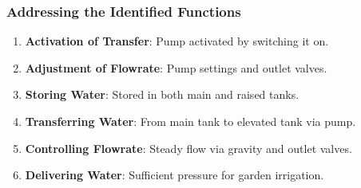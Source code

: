 \documentclass{article}
\begin{document}
\subsubsection*{Addressing the Identified Functions}
\begin{enumerate}
    \item \textbf{Activation of Transfer}: Pump activated by switching it on.
    \item \textbf{Adjustment of Flowrate}: Pump settings and outlet valves.
    \item \textbf{Storing Water}: Stored in both main and raised tanks.
    \item \textbf{Transferring Water}: From main tank to elevated tank via pump.
    \item \textbf{Controlling Flowrate}: Steady flow via gravity and outlet valves.
    \item \textbf{Delivering Water}: Sufficient pressure for garden irrigation.
\end{enumerate}
\end{document}
